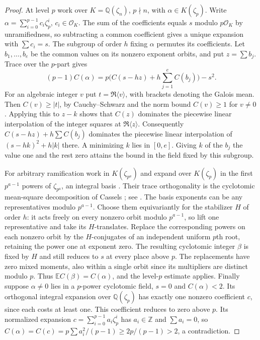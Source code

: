 \documentclass[11pt]{amsart}
\numberwithin{equation}{section}
\theoremstyle{definition}
\theoremstyle{plain}
\newcommand{\QQ}{\mathbb Q}
\newcommand{\ZZ}{\mathbb Z}
\begin{document}
\begin{proof}
At level $p$ work over $K=\QQ(\zeta_n)$, $p\nmid n$, with $\alpha\in K(\zeta_p)$. Write $\alpha=\sum_{i=0}^{p-1}c_i\zeta_p^i$, $c_i\in\mathcal O_K$. The sum of the coefficients equals $s$ modulo $p\mathcal O_K$ by unramifiedness, so subtracting a common coefficient gives a unique expansion with $\sum c_i=s$. The subgroup of order $h$ fixing $\alpha$ permutes its coefficients. Let $b_1,\dots,b_e$ be the common values on its nonzero exponent orbits, and put $z=\sum b_j$. Trace over the $p$-part gives
\[
 (p-1)C(\alpha)=p\big(C(s-hz)+h\sum_{j=1}^e C(b_j)\big)-s^2 .
\]
For an algebraic integer $v$ put $t=\Re\langle v\rangle$, with brackets denoting the Galois mean. Then $C(v)\ge|t|$, by Cauchy--Schwarz and the norm bound $C(v)\ge1$ for $v\ne0$. Applying this to $z-k$ shows that $C(z)$ dominates the piecewise linear interpolation of the integer squares at $\Re\langle z\rangle$. Consequently $C(s-hz)+h\sum C(b_j)$ dominates the piecewise linear interpolation of $(s-hk)^2+h|k|$ there. A minimizing $k$ lies in $[0,e]$. Giving $k$ of the $b_j$ the value one and the rest zero attains the bound in the field fixed by this subgroup.

For arbitrary ramification work in $K(\zeta_{p^a})$ and expand over $K(\zeta_p)$ in the first $p^{a-1}$ powers of $\zeta_{p^a}$, an integral basis \cite[Theorem~2.6]{Washington}. Their trace orthogonality is the cyclotomic mean-square decomposition of Cassels \cite{CasselsRobinson}; see \cite[Lemma~5.2.1]{CMSCyclotomic}. The basis exponents can be any representatives modulo $p^{a-1}$. Choose them equivariantly for the stabilizer $H$ of order $h$: it acts freely on every nonzero orbit modulo $p^{a-1}$, so lift one representative and take its $H$-translates. Replace the corresponding powers on each nonzero orbit by the $H$-conjugates of an independent uniform $p$th root, retaining the power one at exponent zero. The resulting cyclotomic integer $\beta$ is fixed by $H$ and still reduces to $s$ at every place above $p$. The replacements have zero mixed moments, also within a single orbit since its multipliers are distinct modulo $p$. Thus $\mathbb E C(\beta)=C(\alpha)$, and the level-$p$ estimate applies.
Finally suppose $\alpha\ne0$ lies in a $p$-power cyclotomic field,
$s=0$ and $C(\alpha)<2$. Its orthogonal integral expansion over
$\QQ(\zeta_p)$ has exactly one nonzero coefficient $c$, since each
costs at least one. This coefficient reduces to zero above $p$.
Its normalized expansion $c=\sum_{i=0}^{p-1}a_i\zeta_p^i$ has
$a_i\in\ZZ$ and $\sum a_i=0$, so
$C(\alpha)=C(c)=p\sum a_i^2/(p-1)\ge2p/(p-1)>2$, a contradiction.
\end{proof}
\end{document}
